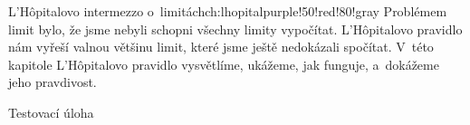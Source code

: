 \begin{chapterintro}{L'Hôpitalovo intermezzo o~limitách}{ch:lhopital}{purple!50!red!80!gray}{}
    Problémem limit bylo, že jsme nebyli schopni všechny limity vypočítat.
    L'Hôpitalovo pravidlo nám vyřeší valnou většinu limit, které jsme ještě
    nedokázali spočítat. V~této kapitole L'Hôpitalovo pravidlo vysvětlíme, ukážeme,
    jak funguje, a~dokážeme jeho pravdivost.
\end{chapterintro}

\begin{exercise}
    Testovací úloha
\end{exercise}
